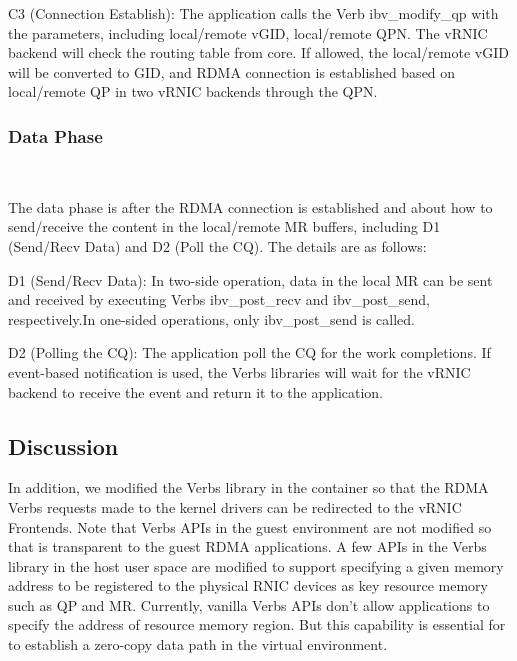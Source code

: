 C3 (Connection Establish): The application calls the Verb ibv\_modify\_qp with the parameters, including local/remote vGID, local/remote QPN. The vRNIC backend will check the routing table from \sys core. If allowed, the local/remote vGID will be converted to GID, and RDMA connection is established based on local/remote QP in two vRNIC backends through the QPN. 

\subsubsection{\textbf{Data Phase}}
\
\noindent

The data phase is after the RDMA connection is established and about how to send/receive the content in the local/remote MR buffers, including D1 (Send/Recv Data) and D2 (Poll the CQ). The details are as follows:


D1 (Send/Recv Data): In two-side operation, data in the local MR can be sent and received by executing Verbs ibv\_post\_recv and ibv\_post\_send, respectively.In one-sided operations, only ibv\_post\_send is called.


D2 (Polling the CQ): The application poll the CQ for the work completions. If event-based notification is used, the Verbs libraries will wait for the vRNIC backend to receive the event and return it to the application.

\subsection{Discussion}

In addition, we modified the Verbs library in the container so that the RDMA Verbs requests made to the kernel drivers can be redirected to the vRNIC Frontends. Note that Verbs APIs in the guest environment are not modified so that \sys is transparent to the guest RDMA applications. A few APIs in the Verbs library in the host user space are modified to support specifying a given memory address to be registered to the physical RNIC devices as key resource memory such as QP and MR. Currently, vanilla Verbs APIs don't allow applications to specify the address of resource memory region. But this capability is essential for \sys to establish a zero-copy data path in the virtual environment.


